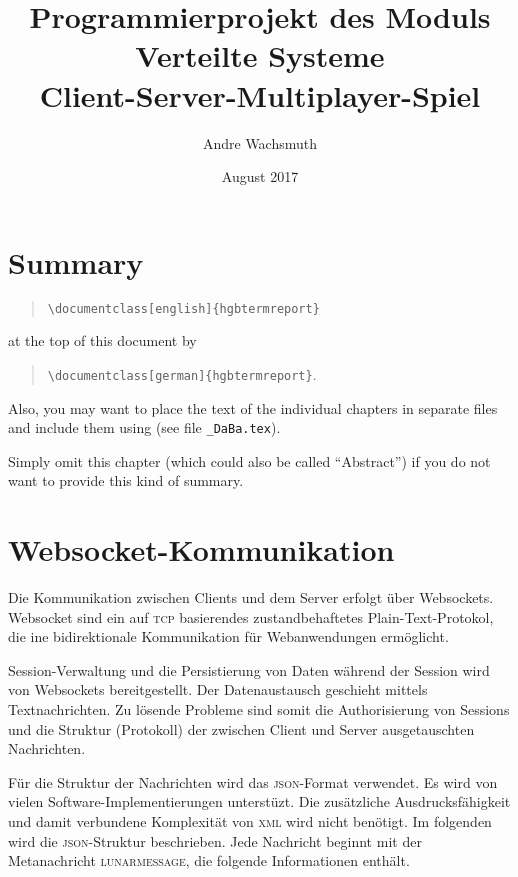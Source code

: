 \documentclass[english,11pt]{report}
\author{Andre Wachsmuth}
\title{Programmierprojekt des Moduls Verteilte Systeme \\ Client-Server-Multiplayer-Spiel}
\date{August 2017}
\begin{document}
\maketitle
\tableofcontents

\chapter*{Summary}

\begin{quote}
 \verb!\documentclass[english]{hgbtermreport}! 
\end{quote}
at the top of this document by
\begin{quote}
 \verb!\documentclass[german]{hgbtermreport}!.
\end{quote}
Also, you may want to place the text of the individual chapters in separate files and 
include them using \verb!! 
(see file \verb!_DaBa.tex!).

Simply omit this chapter (which could also be called ``Abstract'') if you do not want to provide this kind of summary.


\chapter{Websocket-Kommunikation}

Die Kommunikation zwischen Clients und dem Server erfolgt über Websockets. Websocket
sind ein auf \textsc{tcp} basierendes zustandbehaftetes Plain-Text-Protokol, die 
ine bidirektionale Kommunikation für Webanwendungen ermöglicht.

Session-Verwaltung und die Persistierung von Daten während der Session wird von Websockets bereitgestellt.
Der Datenaustausch geschieht mittels Textnachrichten. Zu lösende Probleme sind somit die Authorisierung
von Sessions und die Struktur (Protokoll) der zwischen Client und Server ausgetauschten Nachrichten.

Für die Struktur der Nachrichten wird das \textsc{json}-Format verwendet. Es wird von vielen
Software-Implementierungen unterstüzt. Die zusätzliche Ausdrucksfähigkeit und damit verbundene
Komplexität von \textsc{xml} wird nicht benötigt. Im folgenden wird die \textsc{json}-Struktur
beschrieben. Jede Nachricht beginnt mit der Metanachricht \textsc{lunarmessage}, die folgende Informationen
enthält.
\end{document}
